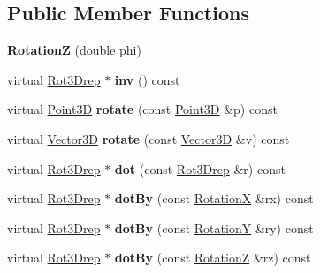 \subsection*{Public Member Functions}
\begin{DoxyCompactItemize}
\item 
\mbox{\label{classRotationZ_ae164f21147311ca0ed72caac710938d6}} 
{\bfseries RotationZ} (double phi)
\item 
\mbox{\label{classRotationZ_ae62ce25d36ebdef20c0f79d1d77fc455}} 
virtual \hyperlink{classRot3Drep}{Rot3\+Drep} $\ast$ {\bfseries inv} () const
\item 
\mbox{\label{classRotationZ_ab44c188ca0bbfd6d61021dd8496600b4}} 
virtual \hyperlink{classTVec3D}{Point3D} {\bfseries rotate} (const \hyperlink{classTVec3D}{Point3D} \&p) const
\item 
\mbox{\label{classRotationZ_aa5de61658ebcd43d7a1769d68a17c967}} 
virtual \hyperlink{classTVec3D}{Vector3D} {\bfseries rotate} (const \hyperlink{classTVec3D}{Vector3D} \&v) const
\item 
\mbox{\label{classRotationZ_a94296471d44c3ee104bd36faaa3de83a}} 
virtual \hyperlink{classRot3Drep}{Rot3\+Drep} $\ast$ {\bfseries dot} (const \hyperlink{classRot3Drep}{Rot3\+Drep} \&r) const
\item 
\mbox{\label{classRotationZ_ae8c91953f2624ec8e735a390dc021534}} 
virtual \hyperlink{classRot3Drep}{Rot3\+Drep} $\ast$ {\bfseries dot\+By} (const \hyperlink{classRotationX}{RotationX} \&rx) const
\item 
\mbox{\label{classRotationZ_a6e7aadac7ccc37ea03669b3df3da3a67}} 
virtual \hyperlink{classRot3Drep}{Rot3\+Drep} $\ast$ {\bfseries dot\+By} (const \hyperlink{classRotationY}{RotationY} \&ry) const
\item 
\mbox{\label{classRotationZ_a2e0e11749f2c1163d1ca085bb161acba}} 
virtual \hyperlink{classRot3Drep}{Rot3\+Drep} $\ast$ {\bfseries dot\+By} (const \hyperlink{classRotationZ}{RotationZ} \&rz) const
\item 
\mbox{\label{classRotationZ_ae8cb8f3d22d32d19aac9bb3d92d9b481}} 

\end{DoxyCompactItemize}
